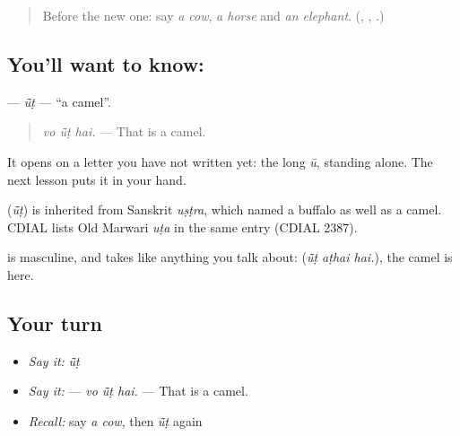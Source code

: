 \label{lesson:MW-C153-unt}



\begin{quote}
Before the new one: say \emph{a cow}, \emph{a horse} and \emph{an elephant}. (\textbf{}, \textbf{}, \textbf{}.)
\end{quote}

\subsection*{You'll want to know: }
\textbf{} — \emph{ū̃ṭ} — \textquotedblleft{}a camel\textquotedblright{}.

\begin{quote}
\textbf{  }
\end{quote}

\begin{quote}
\emph{vo ū̃ṭ hai.} — That is a camel.
\end{quote}

It opens on a letter you have not written yet: the long \emph{ū}, standing alone. The next lesson puts it in your hand.

\begin{cousinweb}
\textbf{} (\emph{ū̃ṭ}) is inherited from Sanskrit \emph{uṣṭra}, which named a buffalo as well as a camel. CDIAL lists Old Marwari \emph{uṭa} in the same entry (CDIAL 2387).
\end{cousinweb}

\begin{grammarlens}[title={What you've built}]
\textbf{} is masculine, and takes \textbf{} like anything you talk about: \textbf{  } (\emph{ū̃ṭ aṭhai hai.}), the camel is here.
\end{grammarlens}

\subsection*{Your turn}
\begin{itemize}
\raggedright
  \item \emph{Say it:} \emph{ū̃ṭ}
  \item \emph{Say it:} \textbf{  } — \emph{vo ū̃ṭ hai.} — That is a camel.
  \item \emph{Recall:} say \emph{a cow}, then \emph{ū̃ṭ} again
\end{itemize}

